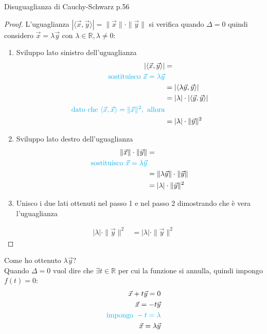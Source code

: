 \documentclass{article}  %
\begin{document}
\begin{theorem}{Disuguaglianza di Cauchy-Schwarz p.56}
\begin{proof}
		L'uguaglianza $|\langle \vec{x}, \vec{y} \rangle| = \|\vec{x}\| \cdot \|\vec{y}\|$ si verifica quando $\Delta = 0$ quindi considero $\vec{x}=\lambda \vec{y}$
		con $\lambda \in \mathbb{R}, \lambda \neq 0$: \\
		\begin{enumerate}
			\item Sviluppo lato sinistro dell'uguaglianza
			      \begin{align*}
				      |\langle \vec{x}, \vec{y} \rangle| & =                                                              \\
				      \textcolor{cyan}{\text{sostituisco } \vec{x} = \lambda \vec{y}}                                     \\
				                                         & = |\langle \lambda \vec{y}, \vec{y} \rangle|                   \\
				                                         & = |\lambda| \cdot |\langle \vec{y}, \vec{y} \rangle|           \\
				      \textcolor{cyan}{\text{dato che } \langle \vec{x}, \vec{x} \rangle = \|\vec{x}\|^2, \text{ allora}} \\
				                                         & = |\lambda| \cdot \|\vec{y}\|^2
			      \end{align*}
			\item Sviluppo lato destro dell'uguaglianza
			      \begin{align*}
				      \|\vec{x}\| \cdot \|\vec{y}\| & =                                       \\
				      \textcolor{cyan}{\text{sostituisco } \vec{x} = \lambda \vec{y}}         \\
				                                    & = \|\lambda \vec{y}\| \cdot \|\vec{y}\| \\
				                                    & = |\lambda| \cdot \|\vec{y}\|^2
			      \end{align*}
			\item Unisco i due lati ottenuti nel passo 1 e nel passo 2 dimostrando che è vera l'uguaglianza
		\end{enumerate}
		\begin{align*}
			|\lambda| \cdot \|\vec{y}\|^2 & = |\lambda| \cdot \|\vec{y}\|^2
		\end{align*}
	\end{proof}
	Come ho ottenuto $\lambda\vec{y}$? \\
	Quando $\Delta = 0$ vuol dire che $\exists t \in \mathbb{R}$ per cui la funzione si annulla, quindi impongo $f(t) = 0$:
	\begin{align*}
		\vec{x}+t\vec{y} = 0                           \\
		\vec{x} = -t\vec{y}                            \\
		\textcolor{cyan}{\text{impongo } -t = \lambda} \\
		\vec{x} = \lambda\vec{y}
	\end{align*}
\end{theorem}
\end{document}
